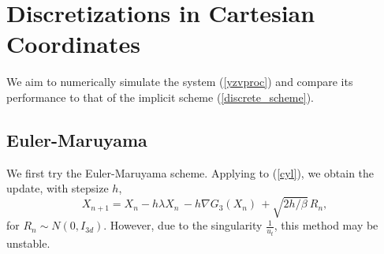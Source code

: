 \documentclass[11pt, twoside]{report}
\begin{document}
\section{Discretizations in Cartesian Coordinates}
We aim to numerically simulate the system (\ref{yzvproc}) and compare its performance to that of the implicit scheme (\ref{discrete_scheme}). 
\subsection{Euler-Maruyama}
We first try the Euler-Maruyama scheme. Applying to (\ref{cyl}), we obtain the update, with stepsize $h$,
\[X_{n+1} = X_n - h\lambda X_n \, - h\nabla G_{3}(X_n)\, + \sqrt{2h/\beta}\,R_n,\]
for $R_n \sim N(0,I_{3d})$. However, due to the singularity $\frac{1}{u_t}$, this method may be unstable.
\end{document}
